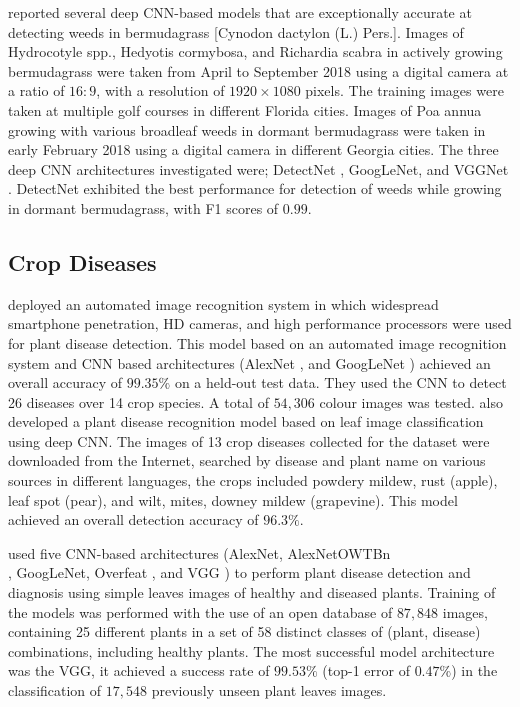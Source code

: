 \documentclass[12pt]{report}
\numberwithin{equation}{section}
\begin{document}
{\cite{yu2019deep}} reported several deep CNN-based models that are exceptionally accurate at detecting weeds in bermudagrass [{Cynodon dactylon} (L.) Pers.]. Images of {Hydrocotyle} spp., {Hedyotis cormybosa}, and {Richardia scabra} in actively growing bermudagrass were taken from April to September 2018 using a digital camera  at a ratio of $16:9$, with a resolution of $1920\times 1080$ pixels. The training images were taken at multiple golf courses in different Florida cities. Images of {Poa annua} growing with various broadleaf weeds in dormant bermudagrass were taken in early February 2018 using a digital camera in different Georgia cities. The three deep CNN architectures investigated were; DetectNet {\cite{tao2016detectnet}}, GoogLeNet, and VGGNet {\cite{simonyan2014very}}. DetectNet exhibited the best performance for detection of weeds while growing in dormant bermudagrass, with F1 scores of $0.99$.


\subsection{Crop Diseases}
{\cite{prasanna2016using}} deployed an automated image recognition system in which widespread smartphone penetration, HD cameras, and high performance processors were used for plant disease detection. This model based on an automated image recognition system and CNN based architectures (AlexNet {\cite{Krizhevsky}}, and GoogLeNet {\cite{szegedy2015going}}) achieved an overall accuracy of $99.35\%$ on a held-out test data. They used the CNN to detect 26 diseases over 14 crop species. A total of $54,306$ colour images was tested. {\cite{sladojevic2016deep}} also developed a plant disease recognition model based on leaf image classification using deep CNN. The images of 13 crop diseases collected for the dataset were downloaded from the Internet, searched by disease and plant name on various sources in different languages, the crops included powdery mildew, rust (apple), leaf spot (pear), and wilt, mites, downey mildew (grapevine). This model achieved an overall detection accuracy of $96.3\%$.

{\cite{ferentinos2018deep}} used five CNN-based architectures (AlexNet, AlexNetOWTBn \\ {\cite{krizhevsky2014one}}, GoogLeNet, Overfeat {\cite{sermanet2013overfeat}}, and VGG {\cite{simonyan2014very}}) to perform plant disease detection and diagnosis using simple leaves images of healthy and diseased plants. Training of the models was performed with the use of an open database of $87,848$ images, containing 25 different plants in a set of 58 distinct classes of (plant, disease) combinations, including healthy plants. The most successful model architecture was the VGG, it achieved a success rate of $99.53\%$ (top-1 error of $0.47\%$) in the classification of $17,548$ previously unseen plant leaves images.
\end{document}
